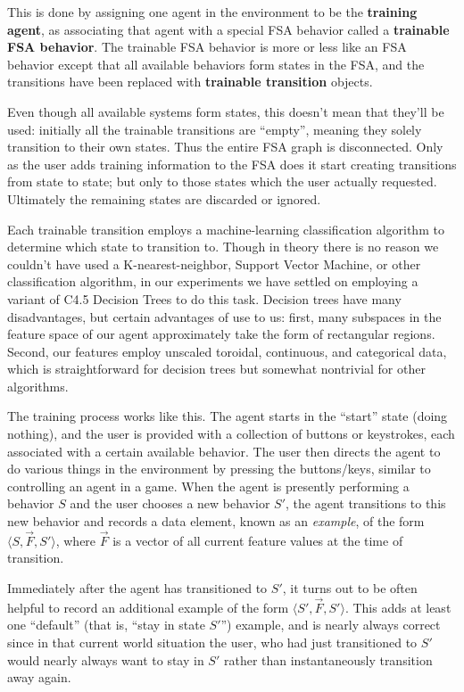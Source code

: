 \documentclass[11pt]{article}
\begin{document}
This is done by assigning one agent in the environment to be the {\bf training agent}, as associating that agent with a special FSA behavior called a {\bf trainable FSA behavior}.    The trainable FSA behavior is more or less like an FSA behavior except that all available behaviors form states in the FSA, and the transitions have been replaced with {\bf trainable transition} objects.

Even though all available systems form states, this doesn't mean that they'll be used: initially all the trainable transitions are ``empty'', meaning they solely transition to their own states.  Thus the entire FSA graph is disconnected.  Only as the user adds training information to the FSA does it start creating transitions from state to state; but only to those states which the user actually requested.  Ultimately the remaining states are discarded or ignored.

Each trainable transition employs a machine-learning classification algorithm to determine which state to transition to.  Though in theory there is no reason we couldn't have used a K-nearest-neighbor, Support Vector Machine, or other classification algorithm, in our experiments we have settled on employing a variant of C4.5 Decision Trees to do this task.  Decision trees have many disadvantages, but certain advantages of use to us: first, many subspaces in the feature space of our agent approximately take the form of rectangular regions.  Second, our features employ unscaled toroidal, continuous, and categorical data, which is straightforward for decision trees but somewhat nontrivial for other algorithms.

The training process works like this.  The agent starts in the ``start'' state (doing nothing), and the user is provided with a collection of buttons or keystrokes, each associated with a certain available behavior.  The user then directs the agent to do various things in the environment by pressing the buttons/keys, similar to controlling an agent in a game. When the agent is presently performing a behavior \(S\) and the user chooses a new behavior \(S'\), the agent transitions to this new behavior and records a data element, known as an {\it example}, of the form \(\langle S, \vec{F}, S'\rangle\), where \(\vec{F}\) is a vector of all current feature values at the time of transition.

Immediately after the agent has transitioned to \(S'\), it turns out to be often helpful to record an additional example of the form \(\langle S', \vec{F}, S'\rangle\).  This adds at least one ``default'' (that is, ``stay in state \(S'\)'') example, and is nearly always correct since in that current world situation the user, who had just transitioned to \(S'\) would nearly always want to stay in \(S'\) rather than instantaneously transition away again.
\end{document}
